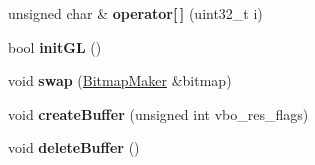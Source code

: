 \begin{DoxyCompactItemize}
\item 
unsigned char \& {\bfseries operator\mbox{[}$\,$\mbox{]}} (uint32\+\_\+t i)\hypertarget{class_bitmap_maker_ac6c610d81a8bd8b11fe150e484afefb8}{}\label{class_bitmap_maker_ac6c610d81a8bd8b11fe150e484afefb8}

\item 
bool {\bfseries init\+GL} ()\hypertarget{class_bitmap_maker_ac000f27d86706d58a359bde3b24a27f8}{}\label{class_bitmap_maker_ac000f27d86706d58a359bde3b24a27f8}

\item 
void {\bfseries swap} (\hyperlink{class_bitmap_maker}{Bitmap\+Maker} \&bitmap)\hypertarget{class_bitmap_maker_a64482b2ced38d7b7ddde58f7d9e0032b}{}\label{class_bitmap_maker_a64482b2ced38d7b7ddde58f7d9e0032b}

\item 
void {\bfseries create\+Buffer} (unsigned int vbo\+\_\+res\+\_\+flags)\hypertarget{class_bitmap_maker_ad7017ecfebf64dcc2d6881cf9c80ce39}{}\label{class_bitmap_maker_ad7017ecfebf64dcc2d6881cf9c80ce39}

\item 
void {\bfseries delete\+Buffer} ()\hypertarget{class_bitmap_maker_afdd0f7f2fa6b42b1d74158fb82d2ec04}{}\label{class_bitmap_maker_afdd0f7f2fa6b42b1d74158fb82d2ec04}

\end{DoxyCompactItemize}
